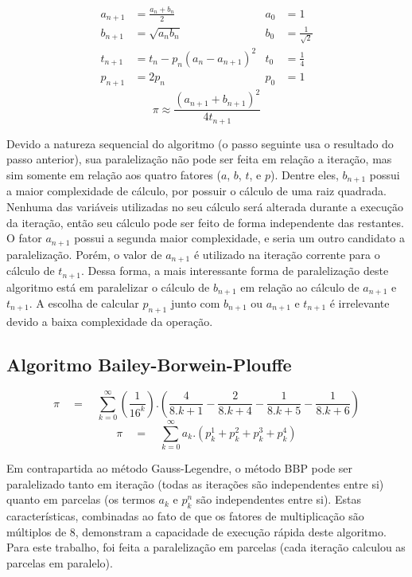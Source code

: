 \documentclass[12pt]{article}
\begin{document}
\begin{equation}
	\begin{aligned}
		a_{n+1} &= \frac{a_n + b_n}{2}			& a_0 &= 1\\
		b_{n+1} &= \sqrt{a_n b_n}				& b_0 &= \frac{1}{\sqrt{2}} \\
		t_{n+1} &= t_n - p_n(a_{n}-a_{n+1})^2	& t_0 &= \frac{1}{4} \\
		p_{n+1} &= 2p_n							& p_0 &= 1		
	\end{aligned}
\end{equation}
\begin{equation}
	\pi \approx \frac{(a_{n+1}+b_{n+1})^2}{4t_{n+1}}
\end{equation}

Devido a natureza sequencial do algoritmo (o passo seguinte usa o resultado do passo anterior),
sua paralelização não pode ser feita em relação a iteração, mas sim somente em relação aos quatro
fatores ($a$, $b$, $t$, e $p$). Dentre eles, $b_{n+1}$ possui a maior complexidade de cálculo,
por possuir o cálculo de uma raiz quadrada. Nenhuma das variáveis utilizadas no seu cálculo
será alterada durante a execução da iteração, então seu cálculo pode ser feito de forma
independente das restantes. O fator $a_{n+1}$ possui a segunda maior complexidade, e seria um
outro candidato a paralelização. Porém, o valor de $a_{n+1}$ é utilizado na iteração corrente
para o cálculo de $t_{n+1}$. Dessa forma, a mais interessante forma de paralelização deste
algoritmo está em paralelizar o cálculo de $b_{n+1}$ em relação ao cálculo de
$a_{n+1}$ e $t_{n+1}$. A escolha de calcular $p_{n+1}$ junto com $b_{n+1}$ ou
$a_{n+1}$ e $t_{n+1}$ é irrelevante devido a baixa complexidade da operação.\\

\subsection{Algoritmo Bailey-Borwein-Plouffe}

\begin{equation}
	\pi \quad = \quad \sum_{k=0}^{\infty}\left(\frac{1}{16^k}\right).
	\left(
		\frac{4}{8.k + 1} - \frac{2}{8.k + 4} - \frac{1}{8.k + 5} - \frac{1}{8.k + 6}
	\right)
\end{equation}
\begin{equation}
	\pi \quad = \quad \sum_{k=0}^{\infty} a_k.
	\left(p^1_k + p^2_k + p^3_k + p^4_k\right)
\end{equation}

Em contrapartida ao método Gauss-Legendre, o método BBP pode ser paralelizado tanto em iteração
(todas as iterações são independentes entre si) quanto em parcelas (os termos $a_k$ e $p^n_k$
são independentes entre si). Estas características, combinadas ao fato de que os fatores de
multiplicação são múltiplos de 8, demonstram a capacidade de execução rápida deste algoritmo.
Para este trabalho, foi feita a paralelização em parcelas (cada iteração calculou as parcelas
em paralelo).\\
\end{document}

